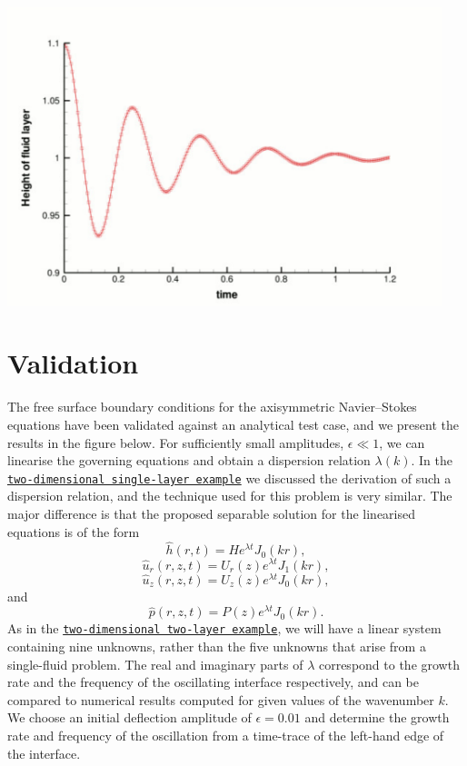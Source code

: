  
\begin{DoxyImage}
\includegraphics[width=0.95\textwidth]{two_layer_interface_axisym_trace}
\end{DoxyImage}




 

\hypertarget{index_validation}{}\section{Validation}\label{index_validation}
The free surface boundary conditions for the axisymmetric Navier--Stokes equations have been validated against an analytical test case, and we present the results in the figure below. For sufficiently small amplitudes, $ \epsilon \ll 1 $, we can linearise the governing equations and obtain a dispersion relation $ \lambda(k) $. In the \href{../../../navier_stokes/single_layer_free_surface/html/index.html#validation}{\tt two-\/dimensional single-\/layer example} we discussed the derivation of such a dispersion relation, and the technique used for this problem is very similar. The major difference is that the proposed separable solution for the linearised equations is of the form \[ \hat{h}(r,t) = H e^{\lambda t} J_0(kr), \] \[ \hat{u}_r(r,z,t) = U_r(z) e^{\lambda t} J_1(kr), \] \[ \hat{u}_z(r,z,t) = U_z(z) e^{\lambda t} J_0(kr), \] and \[ \hat{p}(r,z,t) = P(z) e^{\lambda t} J_0(kr). \] As in the \href{../../../navier_stokes/two_layer_interface/html/index.html#validation}{\tt two-\/dimensional two-\/layer example}, we will have a linear system containing nine unknowns, rather than the five unknowns that arise from a single-\/fluid problem. The real and imaginary parts of $ \lambda $ correspond to the growth rate and the frequency of the oscillating interface respectively, and can be compared to numerical results computed for given values of the wavenumber $ k $. We choose an initial deflection amplitude of $ \epsilon = 0.01 $ and determine the growth rate and frequency of the oscillation from a time-\/trace of the left-\/hand edge of the interface.

